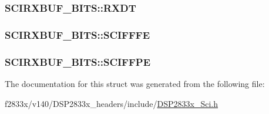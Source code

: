 \subsubsection[{R\+X\+D\+T}]{ S\+C\+I\+R\+X\+B\+U\+F\+\_\+\+B\+I\+T\+S\+::\+R\+X\+D\+T}\label{struct_s_c_i_r_x_b_u_f___b_i_t_s_ad2631cf7cb2d2416642c781944964633}
\hypertarget{struct_s_c_i_r_x_b_u_f___b_i_t_s_af6a12445c5713a479b1d78e5e7389814}{}
\subsubsection[{S\+C\+I\+F\+F\+F\+E}]{ S\+C\+I\+R\+X\+B\+U\+F\+\_\+\+B\+I\+T\+S\+::\+S\+C\+I\+F\+F\+F\+E}\label{struct_s_c_i_r_x_b_u_f___b_i_t_s_af6a12445c5713a479b1d78e5e7389814}
\hypertarget{struct_s_c_i_r_x_b_u_f___b_i_t_s_aa759f441f29b63c2f16820c5823a2b41}{}
\subsubsection[{S\+C\+I\+F\+F\+P\+E}]{ S\+C\+I\+R\+X\+B\+U\+F\+\_\+\+B\+I\+T\+S\+::\+S\+C\+I\+F\+F\+P\+E}\label{struct_s_c_i_r_x_b_u_f___b_i_t_s_aa759f441f29b63c2f16820c5823a2b41}


The documentation for this struct was generated from the following file\+:\begin{DoxyCompactItemize}
\item 
f2833x/v140/\+D\+S\+P2833x\+\_\+headers/include/\hyperlink{_d_s_p2833x___sci_8h}{D\+S\+P2833x\+\_\+\+Sci.\+h}\end{DoxyCompactItemize}
